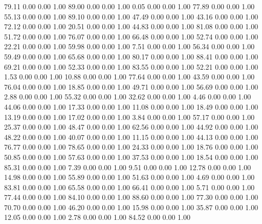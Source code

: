    79.11   0.00   0.00   1.00
   89.00   0.00   0.00   1.00
    0.05   0.00   0.00   1.00
   77.89   0.00   0.00   1.00
   55.13   0.00   0.00   1.00
   89.10   0.00   0.00   1.00
   47.49   0.00   0.00   1.00
   43.16   0.00   0.00   1.00
   72.12   0.00   0.00   1.00
   20.51   0.00   0.00   1.00
   44.83   0.00   0.00   1.00
   81.08   0.00   0.00   1.00
   51.72   0.00   0.00   1.00
   76.07   0.00   0.00   1.00
   66.48   0.00   0.00   1.00
   52.74   0.00   0.00   1.00
   22.21   0.00   0.00   1.00
   59.98   0.00   0.00   1.00
    7.51   0.00   0.00   1.00
   56.34   0.00   0.00   1.00
   59.49   0.00   0.00   1.00
   65.68   0.00   0.00   1.00
   80.17   0.00   0.00   1.00
   88.41   0.00   0.00   1.00
   69.21   0.00   0.00   1.00
   52.33   0.00   0.00   1.00
   83.55   0.00   0.00   1.00
   52.21   0.00   0.00   1.00
    1.53   0.00   0.00   1.00
   10.88   0.00   0.00   1.00
   77.64   0.00   0.00   1.00
   43.59   0.00   0.00   1.00
   76.04   0.00   0.00   1.00
   18.85   0.00   0.00   1.00
   49.71   0.00   0.00   1.00
   56.69   0.00   0.00   1.00
    2.88   0.00   0.00   1.00
   55.32   0.00   0.00   1.00
   32.62   0.00   0.00   1.00
    4.46   0.00   0.00   1.00
   44.06   0.00   0.00   1.00
   17.33   0.00   0.00   1.00
   11.08   0.00   0.00   1.00
   18.49   0.00   0.00   1.00
   13.19   0.00   0.00   1.00
   17.02   0.00   0.00   1.00
    3.84   0.00   0.00   1.00
   57.17   0.00   0.00   1.00
   25.37   0.00   0.00   1.00
   48.47   0.00   0.00   1.00
   62.56   0.00   0.00   1.00
   44.92   0.00   0.00   1.00
   48.22   0.00   0.00   1.00
   40.07   0.00   0.00   1.00
   11.15   0.00   0.00   1.00
   44.13   0.00   0.00   1.00
   76.77   0.00   0.00   1.00
   78.65   0.00   0.00   1.00
   24.33   0.00   0.00   1.00
   18.76   0.00   0.00   1.00
   50.85   0.00   0.00   1.00
   57.63   0.00   0.00   1.00
   37.53   0.00   0.00   1.00
   18.54   0.00   0.00   1.00
   85.31   0.00   0.00   1.00
    7.39   0.00   0.00   1.00
    9.51   0.00   0.00   1.00
   12.78   0.00   0.00   1.00
   14.98   0.00   0.00   1.00
   55.89   0.00   0.00   1.00
   51.63   0.00   0.00   1.00
    4.69   0.00   0.00   1.00
   83.81   0.00   0.00   1.00
   65.58   0.00   0.00   1.00
   66.41   0.00   0.00   1.00
    5.71   0.00   0.00   1.00
   77.44   0.00   0.00   1.00
   84.10   0.00   0.00   1.00
   88.60   0.00   0.00   1.00
   77.30   0.00   0.00   1.00
   70.70   0.00   0.00   1.00
   46.20   0.00   0.00   1.00
   15.98   0.00   0.00   1.00
   35.87   0.00   0.00   1.00
   12.05   0.00   0.00   1.00
    2.78   0.00   0.00   1.00
   84.52   0.00   0.00   1.00
